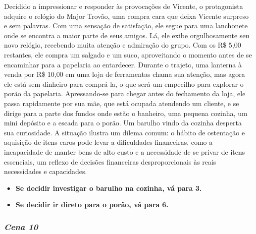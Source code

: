 Decidido a impressionar e responder às provocações de Vicente, o protagonista adquire o relógio do Major Trovão, uma compra cara que deixa Vicente surpreso e sem palavras. Com uma sensação de satisfação, ele segue para uma lanchonete onde se encontra a maior parte de seus amigos. Lá, ele exibe orgulhosamente seu novo relógio, recebendo muita atenção e admiração do grupo. Com os R\$ 5,00 restantes, ele compra um salgado e um suco, aproveitando o momento antes de se encaminhar para a papelaria ao entardecer. Durante o trajeto, uma lanterna à venda por R\$ 10,00 em uma loja de ferramentas chama sua atenção, mas agora ele está sem dinheiro para comprá-la, o que será um empecilho para explorar o porão da papelaria. Apressando-se para chegar antes do fechamento da loja, ele passa rapidamente por sua mãe, que está ocupada atendendo um cliente, e se dirige para a parte dos fundos onde estão o banheiro, uma pequena cozinha, um mini depósito e a escada para o porão. Um barulho vindo da cozinha desperta sua curiosidade. A situação ilustra um dilema comum: o hábito de ostentação e aquisição de itens caros pode levar a dificuldades financeiras, como a incapacidade de manter bens de alto custo e a necessidade de se privar de itens essenciais, um reflexo de decisões financeiras desproporcionais às reais necessidades e capacidades.

\begin{itemize}
	\item \textbf{Se decidir investigar o barulho na cozinha, vá para 3.}
	\item \textbf{Se decidir ir direto para o porão, vá para 6.}
\end{itemize}


\bigskip\medskip

\subsubsection*{\textit{\textbf{Cena 10}}}

